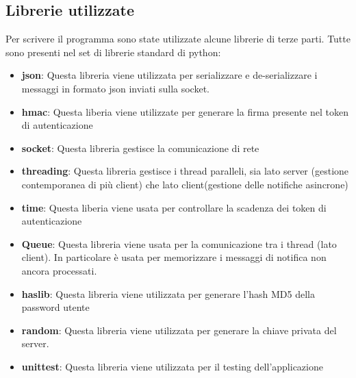 \subsection{Librerie utilizzate}
Per scrivere il programma sono state utilizzate alcune librerie di terze parti. Tutte sono presenti nel set di librerie standard di python:
\begin{itemize}
\item{\textbf{json}}: Questa libreria viene utilizzata per serializzare e de-serializzare i messaggi in formato json inviati sulla socket.
\item{\textbf{hmac}}: Questa liberia viene utilizzate per generare la firma presente nel token di autenticazione
\item{\textbf{socket}}: Questa libreria gestisce la comunicazione di rete
\item{\textbf{threading}}: Questa libreria gestisce i thread paralleli, sia lato server (gestione contemporanea di più client) che lato client(gestione delle notifiche asincrone)
\item{\textbf{time}}: Questa liberia viene usata per controllare la scadenza dei token di autenticazione
\item{\textbf{Queue}}: Questa libreria viene usata per la comunicazione tra i thread (lato client). In particolare è usata per memorizzare i messaggi di notifica non ancora processati.
\item{\textbf{haslib}}: Questa libreria viene utilizzata per generare l'hash MD5 della password utente
\item{\textbf{random}}: Questa libreria viene utilizzata per generare la chiave privata del server.
\item{\textbf{unittest}}: Questa libreria viene utilizzata per il testing dell'applicazione
\end{itemize}